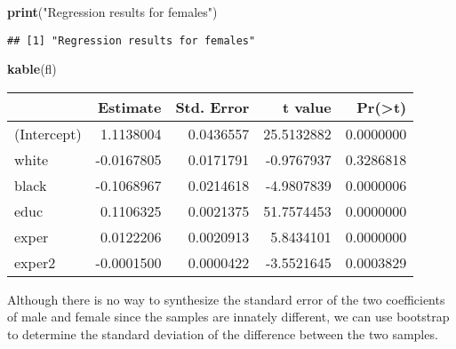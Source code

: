 \documentclass[
]{article}
\newenvironment{Shaded}{\begin{snugshade}}{\end{snugshade}}
\newcommand{\KeywordTok}[1]{\textcolor[rgb]{0.13,0.29,0.53}{\textbf{#1}}}
\newcommand{\NormalTok}[1]{#1}
\newcommand{\StringTok}[1]{\textcolor[rgb]{0.31,0.60,0.02}{#1}}
\begin{document}
\begin{Shaded}
\begin{Highlighting}[]
\KeywordTok{print}\NormalTok{(}\StringTok{"Regression results for females"}\NormalTok{)}
\end{Highlighting}
\end{Shaded}

\begin{verbatim}
## [1] "Regression results for females"
\end{verbatim}

\begin{Shaded}
\begin{Highlighting}[]
\KeywordTok{kable}\NormalTok{(fl)}
\end{Highlighting}
\end{Shaded}

\begin{longtable}[]{@{}lrrrr@{}}
\toprule
& Estimate & Std. Error & t value &
Pr(\textgreater{}\textbar{}t\textbar{})\tabularnewline
\midrule
\endhead
(Intercept) & 1.1138004 & 0.0436557 & 25.5132882 &
0.0000000\tabularnewline
white & -0.0167805 & 0.0171791 & -0.9767937 & 0.3286818\tabularnewline
black & -0.1068967 & 0.0214618 & -4.9807839 & 0.0000006\tabularnewline
educ & 0.1106325 & 0.0021375 & 51.7574453 & 0.0000000\tabularnewline
exper & 0.0122206 & 0.0020913 & 5.8434101 & 0.0000000\tabularnewline
exper2 & -0.0001500 & 0.0000422 & -3.5521645 & 0.0003829\tabularnewline
\bottomrule
\end{longtable}

Although there is no way to synthesize the standard error of the two
coefficients of male and female since the samples are innately
different, we can use bootstrap to determine the standard deviation of
the difference between the two samples.
\end{document}
